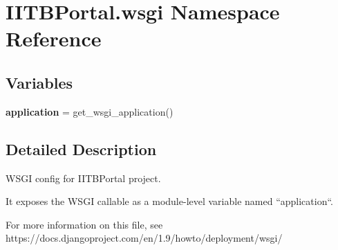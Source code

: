 \hypertarget{namespaceIITBPortal_1_1wsgi}{}\section{I\+I\+T\+B\+Portal.\+wsgi Namespace Reference}
\label{namespaceIITBPortal_1_1wsgi}
\subsection*{Variables}
\begin{DoxyCompactItemize}
\item 
\mbox{\label{namespaceIITBPortal_1_1wsgi_a56df23e096adab89036ab2665033a423}} 
{\bfseries application} = get\+\_\+wsgi\+\_\+application()
\end{DoxyCompactItemize}


\subsection{Detailed Description}
\begin{DoxyVerb}WSGI config for IITBPortal project.

It exposes the WSGI callable as a module-level variable named ``application``.

For more information on this file, see
https://docs.djangoproject.com/en/1.9/howto/deployment/wsgi/
\end{DoxyVerb}
 